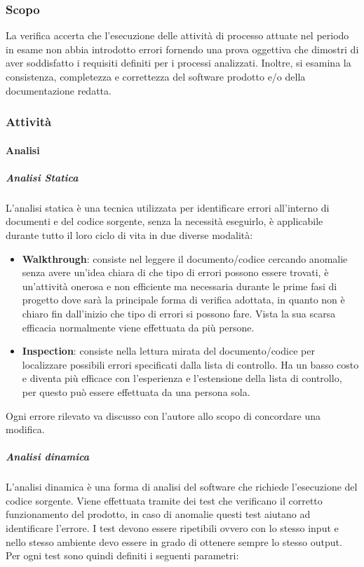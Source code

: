 	\subsubsection{Scopo}
	La verifica accerta che l'esecuzione delle attività di processo attuate nel periodo in esame non abbia introdotto errori fornendo una prova oggettiva che dimostri di aver soddisfatto i requisiti definiti per i processi analizzati.
	Inoltre, si esamina la consistenza, completezza e correttezza del software prodotto e/o della documentazione redatta.
	\subsubsection{Attività}
		\paragraph{Analisi}
			\subparagraph{Analisi Statica} \Spazio
			L'analisi statica è una tecnica utilizzata per identificare errori all'interno di documenti e del codice sorgente, senza la necessità eseguirlo, è applicabile durante tutto il loro ciclo di vita in due diverse modalità:
			\begin{itemize}
				\item \textbf{Walkthrough}:
				consiste nel leggere il documento/codice cercando anomalie senza avere un'idea chiara di che tipo di errori possono essere trovati, è un'attività onerosa e non efficiente ma necessaria durante le prime fasi di progetto dove sarà la principale forma di verifica adottata, in quanto non è chiaro fin dall'inizio che tipo di errori si possono fare.
				Vista la sua scarsa efficacia normalmente viene effettuata da più persone.
				\item \textbf{Inspection}: 
				consiste nella lettura mirata del documento/codice per localizzare possibili errori specificati dalla lista di controllo. Ha un basso costo e diventa più efficace con l'esperienza e l'estensione della lista di controllo, per questo può essere effettuata da una persona sola.
			\end{itemize}
		    Ogni errore rilevato va discusso con l'autore allo scopo di concordare una modifica.
			\subparagraph{Analisi dinamica} \Spazio
			L'analisi dinamica è una forma di analisi del software che richiede l'esecuzione del codice sorgente. Viene effettuata tramite dei test che verificano il corretto funzionamento del prodotto, in caso di anomalie questi test aiutano ad identificare l'errore.
			I test devono essere ripetibili ovvero con lo stesso input e nello stesso ambiente devo essere in grado di ottenere sempre lo stesso output. Per ogni test sono quindi definiti i seguenti parametri:
